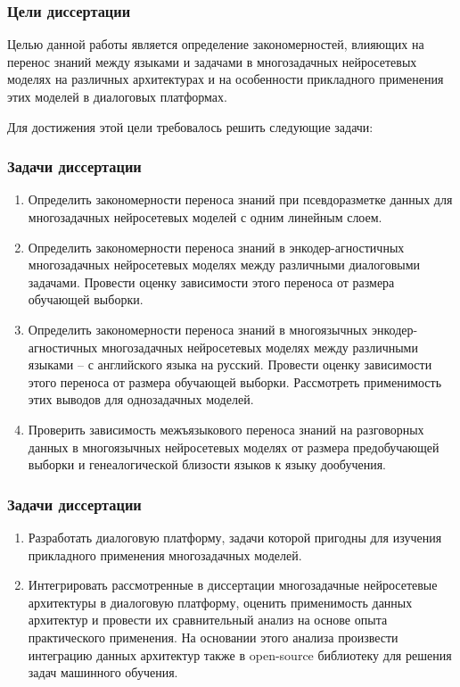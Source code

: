 \begin{frame}
    \setcounter{framenumber}{1}
    \maketitle
\end{frame}


\begin{frame}
    \frametitle{Цели диссертации}
Целью данной работы является определение закономерностей, влияющих на перенос знаний между языками и задачами в многозадачных нейросетевых моделях на различных архитектурах и на особенности прикладного применения этих моделей в диалоговых платформах.

Для достижения этой цели требовалось решить следующие задачи:
\end{frame}

\begin{frame}
\frametitle{Задачи диссертации}
\begin{enumerate}
  \item {Определить закономерности переноса знаний при псевдоразметке данных для многозадачных нейросетевых моделей с одним линейным слоем.}
  \item {Определить закономерности переноса знаний в энкодер-агностичных многозадачных нейросетевых моделях между различными диалоговыми задачами. Провести оценку зависимости этого переноса от размера обучающей выборки.}
  \item {Определить закономерности переноса знаний в многоязычных энкодер-агностичных многозадачных нейросетевых моделях между различными языками -- с английского языка на русский. Провести оценку зависимости этого переноса от размера обучающей выборки. Рассмотреть применимость этих выводов для однозадачных моделей.}
  \item {Проверить зависимость межъязыкового переноса знаний на разговорных данных в многоязычных нейросетевых моделях от размера предобучающей выборки и генеалогической близости языков к языку дообучения.}
\end{enumerate}
\end{frame}

\begin{frame}
\frametitle{Задачи диссертации}
\begin{enumerate}
  \item {Разработать диалоговую платформу, задачи которой пригодны для изучения прикладного применения многозадачных моделей.} %
  \item {Интегрировать рассмотренные в диссертации многозадачные нейросетевые архитектуры в диалоговую платформу, оценить применимость данных архитектур и провести их сравнительный анализ на основе опыта практического применения. На основании этого анализа произвести интеграцию данных архитектур также в open-source библиотеку для решения задач машинного обучения.}%
\end{enumerate}
\end{frame}




